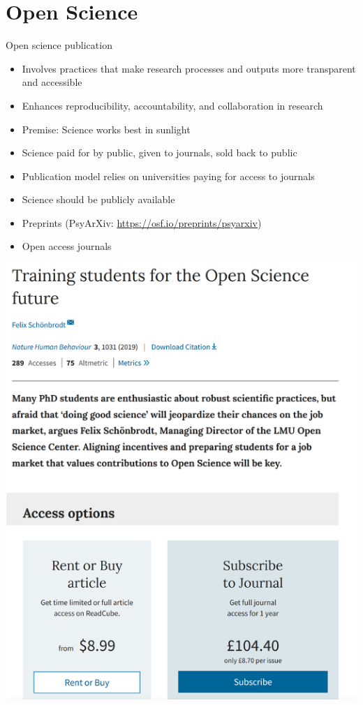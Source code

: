 \documentclass[
  ignorenonframetext,
  aspectratio=169,
]{beamer}
\providecommand{\tightlist}{%
  \setlength{\itemsep}{0pt}\setlength{\parskip}{0pt}}\usepackage{longtable,booktabs,array}
\begin{document}
\section{Open Science}\label{open-science}

\begin{frame}{Open science publication}
\label{open-science-publication}
\begin{itemize}[<+->]
\tightlist
\item
  Involves practices that make research processes and outputs more
  transparent and accessible
\item
  Enhances reproducibility, accountability, and collaboration in
  research
\item
  Premise: Science works best in sunlight
\item
  Science paid for by public, given to journals, sold back to public
\item
  Publication model relies on universities paying for access to journals
\item
  Science should be publicly available
\item
  Preprints (PsyArXiv: \url{https://osf.io/preprints/psyarxiv})
\item
  Open access journals
\end{itemize}
\end{frame}

\begin{frame}{}
\label{section-2}
\begin{center}
\includegraphics{figs/paid-os.png}
\end{center}
\end{frame}
\end{document}
